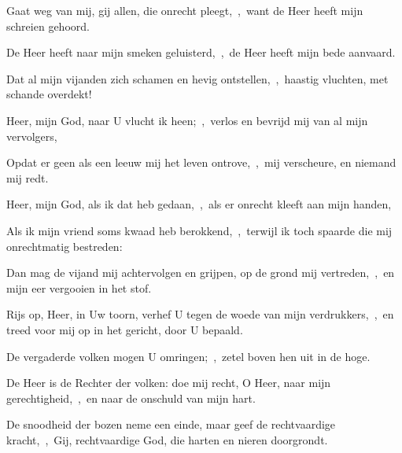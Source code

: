 \documentclass[12pt,twoside,a5paper]{article}
\begin{document}

\begin{halfparskip}
  Gaat weg van mij, gij allen, die onrecht pleegt,~\sep\ want de Heer heeft mijn schreien gehoord.

  De Heer heeft naar mijn smeken geluisterd,~\sep\ de Heer heeft mijn bede aanvaard.

  Dat al mijn vijanden zich schamen en hevig ontstellen,~\sep\ haastig vluchten, met schande overdekt!
\end{halfparskip}



\begin{halfparskip}
  Heer, mijn God, naar U vlucht ik heen;~\sep\ verlos en bevrijd mij van al mijn vervolgers,


  Opdat er geen als een leeuw mij het leven ontrove,~\sep\ mij verscheure, en niemand mij redt.

  Heer, mijn God, als ik dat heb gedaan,~\sep\ als er onrecht kleeft aan mijn handen,

  Als ik mijn vriend soms kwaad heb berokkend,~\sep\ terwijl ik toch spaarde die mij onrechtmatig bestreden:

  Dan mag de vijand mij achtervolgen en grijpen, op de grond mij vertreden,~\sep\ en mijn eer vergooien in het stof.
\end{halfparskip}


\begin{halfparskip}
  Rijs op, Heer, in Uw toorn, verhef U tegen de woede van mijn verdrukkers,~\sep\ en treed voor mij op in het gericht, door U bepaald.

  De vergaderde volken mogen U omringen;~\sep\ zetel boven hen uit in de hoge.

  De Heer is de Rechter der volken: doe mij recht, O Heer, naar mijn gerechtigheid,~\sep\ en naar de onschuld van mijn hart.

  De snoodheid der bozen neme een einde, maar geef de rechtvaardige kracht,~\sep\ Gij, rechtvaardige God, die harten en nieren doorgrondt.
\end{halfparskip}

\end{document}
